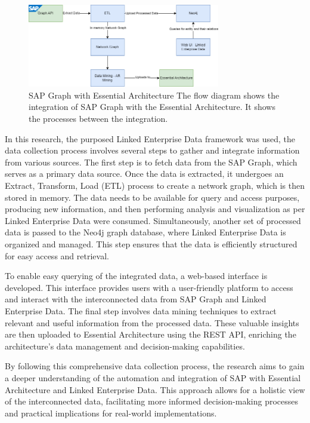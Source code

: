 \documentclass{article}
\begin{document}
\begin{figure}[ht!]
    \centering
    \includegraphics[width=0.75\textwidth]{techique-overview}
    \caption{SAP Graph with Essential Architecture
The flow diagram shows the integration of SAP Graph with the Essential Architecture. It shows the processes between the integration.}
    \label{fig: technique overview}
\end{figure}

In this research, the purposed Linked Enterprise Data framework was used, the data collection process involves several steps to gather and integrate information from various sources. The first step is to fetch data from the SAP Graph, which serves as a primary data source. Once the data is extracted, it undergoes an Extract, Transform, Load (ETL) process to create a network graph, which is then stored in memory. The data needs to be available for query and access purposes, producing new information, and then performing analysis and visualization as per Linked Enterprise Data were consumed. Simultaneously, another set of processed data is passed to the Neo4j graph database, where Linked Enterprise Data is organized and managed. This step ensures that the data is efficiently structured for easy access and retrieval.

To enable easy querying of the integrated data, a web-based interface is developed. This interface provides users with a user-friendly platform to access and interact with the interconnected data from SAP Graph and Linked Enterprise Data. The final step involves data mining techniques to extract relevant and useful information from the processed data. These valuable insights are then uploaded to Essential Architecture using the REST API, enriching the architecture's data management and decision-making capabilities.

By following this comprehensive data collection process, the research aims to gain a deeper understanding of the automation and integration of SAP with Essential Architecture and Linked Enterprise Data. This approach allows for a holistic view of the interconnected data, facilitating more informed decision-making processes and practical implications for real-world implementations.
\end{document}
